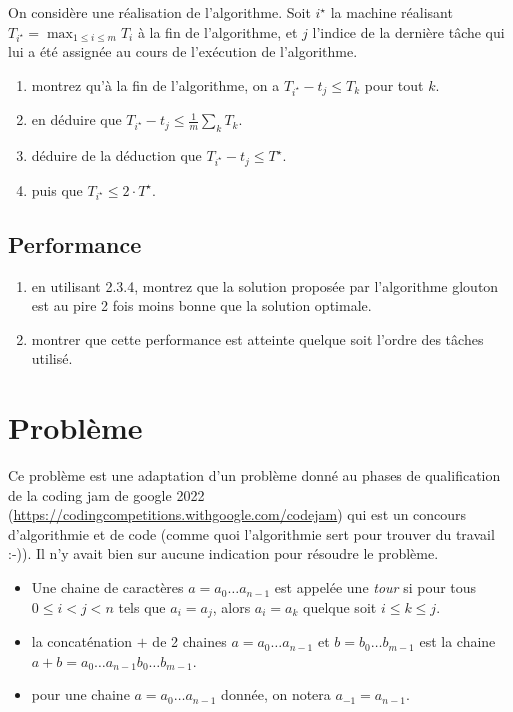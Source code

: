 \documentclass
[12pt]
{article}
\begin{document}
On considère une réalisation de l'algorithme. Soit $i^\star$ la machine réalisant $T_{i^\star} = \max_{1\leq i \leq m} T_i$ à la fin de l'algorithme, et $j$ l'indice de la dernière tâche qui lui a été assignée au cours de l'exécution de l'algorithme.

\begin{enumerate}
    \item montrez qu'à la fin de l'algorithme, on a $T_{i^\star} -t_j \leq T_k$ pour tout $k$.
    \item en déduire que $T_{i ^\star} - t_j \leq \frac{1}{m}\sum_kT_k$.
    \item déduire de la déduction que $T_{i ^\star} - t_j \leq T^\star$.
    \item puis que $T_{i ^\star} \leq 2 \cdot T^\star$.
\end{enumerate}

\subsection{Performance}

\begin{enumerate}
    \item en utilisant 2.3.4, montrez que la solution proposée par l'algorithme glouton est au pire 2 fois moins bonne que la solution optimale.
    \item montrer que cette performance est atteinte quelque soit l'ordre des tâches utilisé.
\end{enumerate}

\section{Problème}

Ce problème est une adaptation d'un problème donné au phases de qualification de la coding jam de google 2022 (\url{https://codingcompetitions.withgoogle.com/codejam}) qui est un concours d'algorithmie et de code (comme quoi l'algorithmie sert pour trouver du travail :-)). Il n'y avait bien sur aucune indication pour résoudre le problème.

\begin{itemize}
    \item Une chaine de caractères $a=a_0\dots a_{n-1}$ est appelée une {\em tour} si pour tous $0\leq i < j < n$ tels que $a_i = a_j$, alors $a_i = a_k$ quelque soit $i \leq k \leq j$.
    \item la concaténation $+$ de 2 chaines $a=a_0\dots a_{n-1}$ et $b = b_0\dots b_{m-1}$ est la chaine $a+b = a_0\dots a_{n-1}b_0 \dots b_{m-1}$.
    \item pour une chaine $a = a_0\dots a_{n-1}$ donnée, on notera $a_{-1} = a_{n-1}$.
\end{itemize}
\end{document}

